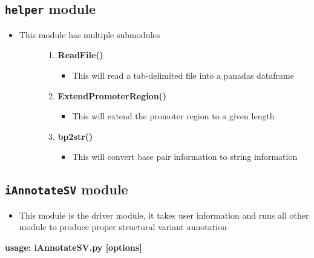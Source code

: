 \documentclass[letterpaper,10pt,english]{sphinxmanual}
\begin{document}
\subsection{\texttt{helper} module}
\label{iAnnotateSV:helper-module}\begin{itemize}
\item {} \begin{description}
\item[{This module has multiple submodules}] \leavevmode\begin{enumerate}
\item {} 
\textbf{ReadFile()}
\begin{itemize}
\item {} 
This will read a tab-delimited file into a panadas dataframe

\end{itemize}

\item {} 
\textbf{ExtendPromoterRegion()}
\begin{itemize}
\item {} 
This will extend the promoter region to a given length

\end{itemize}

\item {} 
\textbf{bp2str()}
\begin{itemize}
\item {} 
This will convert base pair information to string information

\end{itemize}

\end{enumerate}

\end{description}

\end{itemize}


\subsection{\texttt{iAnnotateSV} module}
\label{iAnnotateSV:iannotatesv-module}\begin{itemize}
\item {} 
This module is the driver module, it takes user information and runs all other module to produce proper structural variant annotation

\end{itemize}

\textbf{usage: iAnnotateSV.py {[}options{]}}
\end{document}
